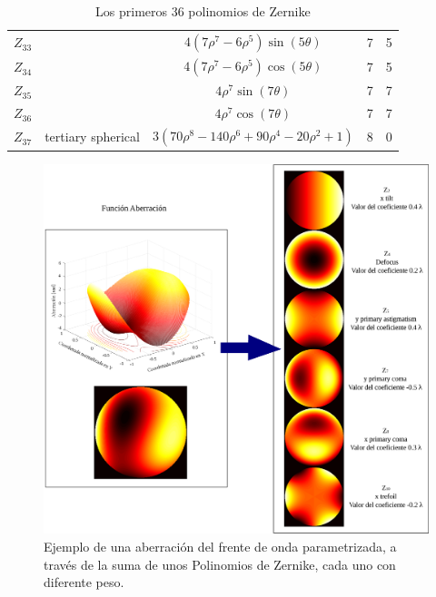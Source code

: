 \begin{table}[htbp]
{\begin{tabular}{|c|c|c|c|c|}
$Z_{33}$ &  & $4 (7\rho^7-6\rho^5)\sin (5\theta) $ & 7 & 5 \\ %
$Z_{34}$ &  & $4 (7\rho^7-6\rho^5)\cos (5\theta) $ & 7 & 5 \\ %
$Z_{35}$ &  & $4\rho^7 \sin (7\theta) $ & 7 & 7 \\ %
$Z_{36}$ &  & $4\rho^7 \cos (7\theta) $ & 7 & 7 \\ %
$Z_{37}$ & tertiary spherical & $3 (70\rho^8-140\rho^6+90\rho^4-20\rho^2 +1)$ & 8 & 0 \\ \hline
\end{tabular}
}
\caption{Los primeros 36 polinomios de Zernike}\label{Table1:Zernike}
\end{table}


\begin{figure}[h!]
\centering
\includegraphics[width=14cm]{aberracion2.eps}\caption{\label{fig:aberracion} Ejemplo de una aberración del frente de onda parametrizada, a través de la suma de unos Polinomios de Zernike, cada uno con diferente peso.}
\end{figure}

\pagebreak
{}
